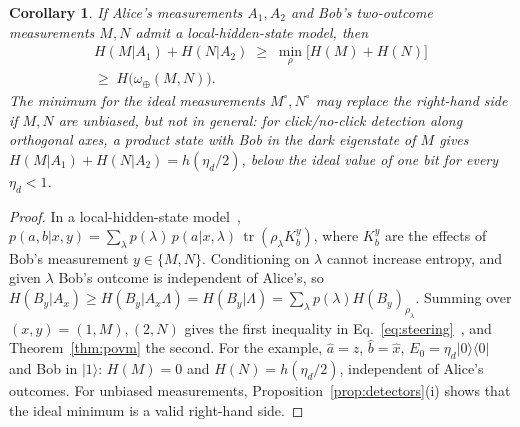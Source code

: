 \documentclass[aps,pra,twocolumn,superscriptaddress,nofootinbib,floatfix]{revtex4-2}
\newtheorem{corollary}{Corollary}
\theoremstyle{definition}
\newcommand{\bra}[1]{\langle #1|}
\newcommand{\ket}[1]{|#1\rangle}
\newcommand{\tr}{\operatorname{tr}}
\newcommand{\omplus}{\omega_{\oplus}}
\begin{document}
\begin{corollary}
\label{cor:steering}
If Alice's measurements $A_1,A_2$ and Bob's two-outcome measurements $M,N$
admit a local-hidden-state model, then
\begin{multline}
  H(M|A_1)+H(N|A_2)\;\ge\;\min_\rho\bigl[H(M)+H(N)\bigr]\\
  \ge\;H\bigl(\omplus(M,N)\bigr).
  \label{eq:steering}
\end{multline}
The minimum for the ideal measurements $M^\circ,N^\circ$ may replace the
right-hand side if $M,N$ are unbiased, but not in general: for click/no-click
detection along orthogonal axes, a product state with Bob in the dark eigenstate
of $M$ gives $H(M|A_1)+H(N|A_2)=h(\eta_d/2)$, below the ideal value of one bit
for every $\eta_d<1$.
\end{corollary}

\begin{proof}
In a local-hidden-state model~\cite{Uola2020},
$p(a,b|x,y)=\sum_\lambda p(\lambda)\,p(a|x,\lambda)\,\tr(\rho_\lambda K^y_b)$, where $K^y_b$ are
the effects of Bob's measurement $y\in\{M,N\}$. Conditioning on $\lambda$ cannot
increase entropy, and given $\lambda$ Bob's outcome is independent of Alice's, so
$H(B_y|A_x)\ge H(B_y|A_x\Lambda)=H(B_y|\Lambda)=\sum_\lambda p(\lambda)H(B_y)_{\rho_\lambda}$.
Summing over $(x,y)=(1,M),(2,N)$ gives the first inequality in
Eq.~\eqref{eq:steering}~\cite{Walborn2011,Schneeloch2013}, and
Theorem~\ref{thm:povm} the second. For the example, $\hat a=\hat z$,
$\hat b=\hat x$, $E_0=\eta_d\ket{0}\!\bra{0}$ and Bob in $\ket{1}$: $H(M)=0$ and
$H(N)=h(\eta_d/2)$, independent of Alice's outcomes. For unbiased measurements,
Proposition~\ref{prop:detectors}(i) shows that the ideal minimum is a valid
right-hand side.
\end{proof}
\end{document}
